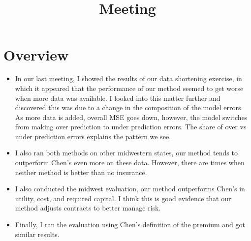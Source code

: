 \documentclass[11pt]{article}
\title{Meeting}
\begin{document}
\maketitle
\section{Overview}
  \begin{itemize}
    \item In our last meeting, I showed the results of our data shortening exercise, in which it appeared that the performance of our method seemed to get worse when more data was available. I looked into this matter further and discovered this was due to a change in the composition of the model errors. As more data is added, overall MSE goes down, however, the model switches from making over prediction to under prediction errors. The share of over vs under prediction errors explains the pattern we see. 
    \item I also ran both methods on other midwestern states, our method tends to outperform Chen's even more on these data. However, there are times when neither method is better than no insurance.
    \item I also conducted the midwest evaluation, our method outperforms Chen's in utility, cost, and required capital. I think this is good evidence that our method adjusts contracts to better manage risk. 
    \item Finally, I ran the evaluation using Chen's definition of the premium and got similar results. 
  \end{itemize}

\end{document}
